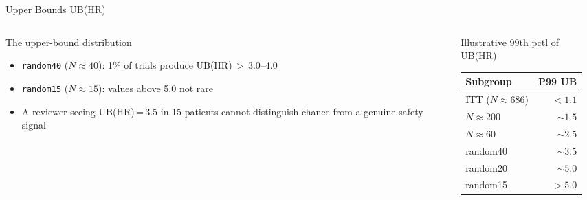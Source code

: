 \documentclass[
  11pt,
  ignorenonframetext,
  aspectratio=169,
]{beamer}
\begin{document}
\begin{frame}{Upper Bounds UB(HR)}
\protect{}\label{upper-bounds-ubhr}
\begin{columns}[T]
\begin{column}{0.55\linewidth}
\begin{block}{The upper-bound distribution}
\begin{itemize}\small
\item \texttt{random40} ($N\!\approx\!40$): 1\% of trials produce UB(HR)\,$>$\,3.0--4.0
\item \texttt{random15} ($N\!\approx\!15$): values above 5.0 not rare
\item A reviewer seeing UB(HR)\,=\,3.5 in 15 patients cannot distinguish
      chance from a genuine safety signal
\end{itemize}
\end{block}
\end{column}

\begin{column}{0.42\linewidth}
\begin{exampleblock}{\footnotesize Illustrative 99th pctl of UB(HR)}
\centering\footnotesize
\begin{tabular}{lr}
\toprule
Subgroup & P99 UB \\
\midrule
ITT ($N\!\approx\!686$) & $<1.1$ \\
$N\!\approx\!200$ & $\sim\!1.5$ \\
$N\!\approx\!60$ & $\sim\!2.5$ \\
random40 & $\sim\!3.5$ \\
random20 & $\sim\!5.0$ \\
random15 & $>5.0$ \\
\bottomrule
\end{tabular}
\end{exampleblock}
\end{column}
\end{columns}
\end{frame}
\end{document}
